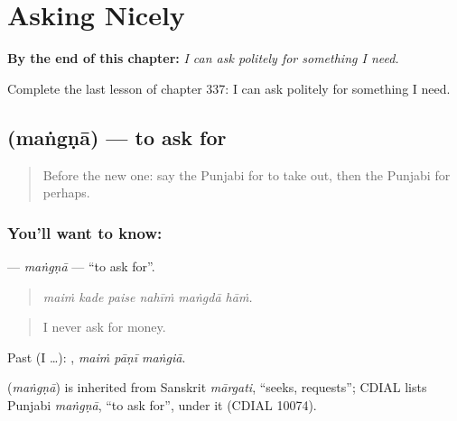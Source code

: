 
\chapter{Asking Nicely}
\label{ch:pa-a2-asking-nicely}

\begin{chapteropening}
\textbf{By the end of this chapter:} \emph{I can ask politely for something I need.}

Complete the last lesson of chapter 337: I can ask politely for something I need.
\end{chapteropening}

\section[\texorpdfstring{\pa{ਮੰਗਣਾ} (maṅgṇā)}{ਮੰਗਣਾ (maṅgṇā)}]{ (maṅgṇā) — to ask for}

\label{lesson:PA-C337-mangna}



\begin{quote}
Before the new one: say the Punjabi for to take out, then the Punjabi for perhaps.
\end{quote}

\subsection*{You'll want to know: }
\textbf{} — \emph{maṅgṇā} — \textquotedblleft{}to ask for\textquotedblright{}.

\begin{quote}
     
\end{quote}

\begin{quote}
\emph{maiṁ kade paise nahīṁ maṅgdā hāṁ.}
\end{quote}

\begin{quote}
I never ask for money.
\end{quote}

Past (I …):   , \emph{maiṁ pāṇī maṅgiā}.

\begin{cousinweb}
\textbf{} (\emph{maṅgṇā}) is inherited from Sanskrit \emph{mārgati}, \textquotedblleft{}seeks, requests\textquotedblright{}; CDIAL lists Punjabi \emph{maṅgṇā}, \textquotedblleft{}to ask for\textquotedblright{}, under it (CDIAL 10074).
\end{cousinweb}


